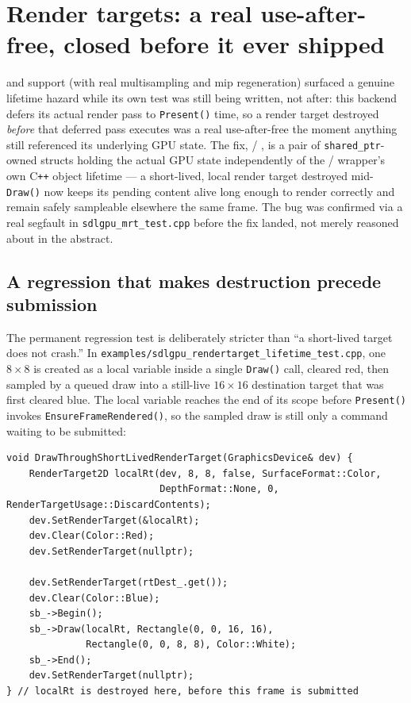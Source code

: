 \section{Render targets: a real use-after-free, closed before it ever shipped}

 and  support (with real multisampling and
mip regeneration) surfaced a genuine lifetime hazard while its own test was still being written,
not after: this backend defers its actual render pass to \texttt{Present()} time, so a render
target destroyed \emph{before} that deferred pass executes was a real use-after-free the moment
anything still referenced its underlying GPU state. The fix,
 / , is a pair of
\texttt{shared\_ptr}-owned structs holding the actual GPU state independently of the
 /  wrapper's own
C\texttt{++} object lifetime --- a short-lived, local render target destroyed mid-\texttt{Draw()}
now keeps its pending content alive long enough to render correctly and remain safely sampleable
elsewhere the same frame. The bug was confirmed via a real segfault in
\texttt{sdlgpu\_mrt\_test.cpp} before the fix landed, not merely reasoned about in the abstract.

\subsection{A regression that makes destruction precede submission}

The permanent regression test is deliberately stricter than ``a short-lived target does not
crash.'' In \texttt{examples/sdlgpu\_rendertarget\_lifetime\_test.cpp}, one \(8\times8\)
 is created as a local variable inside a single \texttt{Draw()} call,
cleared red, then sampled by a queued  draw into a still-live
\(16\times16\) destination target that was first cleared blue. The local variable reaches the
end of its scope before \texttt{Present()} invokes \texttt{EnsureFrameRendered()}, so the
sampled draw is still only a command waiting to be submitted:

\begin{lstlisting}
void DrawThroughShortLivedRenderTarget(GraphicsDevice& dev) {
    RenderTarget2D localRt(dev, 8, 8, false, SurfaceFormat::Color,
                           DepthFormat::None, 0, RenderTargetUsage::DiscardContents);
    dev.SetRenderTarget(&localRt);
    dev.Clear(Color::Red);
    dev.SetRenderTarget(nullptr);

    dev.SetRenderTarget(rtDest_.get());
    dev.Clear(Color::Blue);
    sb_->Begin();
    sb_->Draw(localRt, Rectangle(0, 0, 16, 16),
              Rectangle(0, 0, 8, 8), Color::White);
    sb_->End();
    dev.SetRenderTarget(nullptr);
} // localRt is destroyed here, before this frame is submitted
\end{lstlisting}

